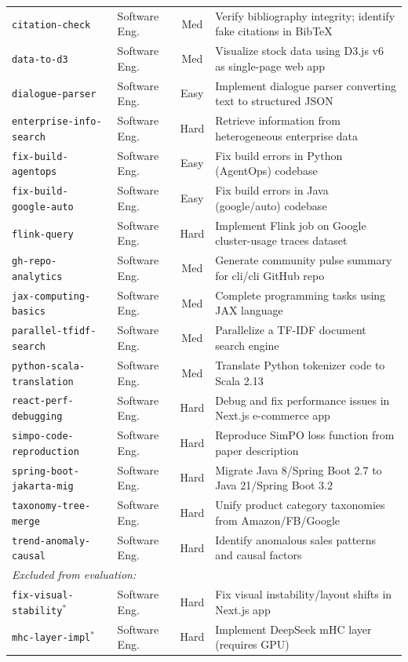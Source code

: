 \begin{longtable}{p{4.5cm}p{2.5cm}cp{7.5cm}}
\texttt{citation-check} & Software Eng. & Med & Verify bibliography integrity; identify fake citations in BibTeX \\
\texttt{data-to-d3} & Software Eng. & Med & Visualize stock data using D3.js v6 as single-page web app \\
\texttt{dialogue-parser} & Software Eng. & Easy & Implement dialogue parser converting text to structured JSON \\
\texttt{enterprise-info-search} & Software Eng. & Hard & Retrieve information from heterogeneous enterprise data \\
\texttt{fix-build-agentops} & Software Eng. & Easy & Fix build errors in Python (AgentOps) codebase \\
\texttt{fix-build-google-auto} & Software Eng. & Easy & Fix build errors in Java (google/auto) codebase \\
\texttt{flink-query} & Software Eng. & Hard & Implement Flink job on Google cluster-usage traces dataset \\
\texttt{gh-repo-analytics} & Software Eng. & Med & Generate community pulse summary for cli/cli GitHub repo \\
\texttt{jax-computing-basics} & Software Eng. & Med & Complete programming tasks using JAX language \\
\texttt{parallel-tfidf-search} & Software Eng. & Med & Parallelize a TF-IDF document search engine \\
\texttt{python-scala-translation} & Software Eng. & Med & Translate Python tokenizer code to Scala 2.13 \\
\texttt{react-perf-debugging} & Software Eng. & Hard & Debug and fix performance issues in Next.js e-commerce app \\
\texttt{simpo-code-reproduction} & Software Eng. & Hard & Reproduce SimPO loss function from paper description \\
\texttt{spring-boot-jakarta-mig} & Software Eng. & Hard & Migrate Java 8/Spring Boot 2.7 to Java 21/Spring Boot 3.2 \\
\texttt{taxonomy-tree-merge} & Software Eng. & Hard & Unify product category taxonomies from Amazon/FB/Google \\
\texttt{trend-anomaly-causal} & Software Eng. & Hard & Identify anomalous sales patterns and causal factors \\
\midrule

\multicolumn{4}{l}{\textit{Excluded from evaluation:}} \\
\texttt{fix-visual-stability}$^*$ & Software Eng. & Hard & Fix visual instability/layout shifts in Next.js app \\
\texttt{mhc-layer-impl}$^*$ & Software Eng. & Hard & Implement DeepSeek mHC layer (requires GPU) \\

\end{longtable}
\normalsize

